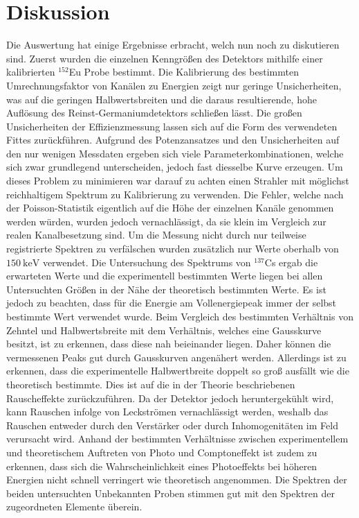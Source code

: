 
\section{Diskussion}
\label{sec:Diskussion}
Die Auswertung hat einige Ergebnisse erbracht, welch nun noch zu diskutieren sind. Zuerst wurden die einzelnen Kenngrößen des Detektors mithilfe einer kalibrierten $^{152}$Eu Probe bestimmt. Die Kalibrierung des bestimmten Umrechnungsfaktor von Kanälen zu Energien zeigt nur geringe Unsicherheiten, was auf die geringen Halbwertsbreiten und die daraus resultierende, hohe Auflösung des Reinst-Germaniumdetektors schließen lässt. Die großen Unsicherheiten der Effizienzmessung lassen sich auf die Form des verwendeten Fittes zurückführen. Aufgrund des Potenzansatzes und den Unsicherheiten auf den nur wenigen Messdaten ergeben sich viele Parameterkombinationen, welche sich zwar grundlegend unterscheiden, jedoch fast diesselbe Kurve erzeugen. Um dieses Problem zu minimieren war darauf zu achten einen Strahler mit möglichst reichhaltigem Spektrum zu Kalibrierung zu verwenden. Die Fehler, welche nach der Poisson-Statistik eigentlich auf die Höhe der einzelnen Kanäle genommen werden würden, wurden jedoch vernachlässigt, da sie klein im Vergleich zur realen Kanalbesetzung sind. Um die Messung nicht durch nur teilweise registrierte Spektren zu verfälschen wurden zusätzlich nur Werte oberhalb von $\SI{150}{\kilo\electronvolt}$ verwendet. Die Untersuchung des Spektrums von $^{137}$Cs ergab die erwarteten Werte und die experimentell bestimmten Werte liegen bei allen Untersuchten Größen in der Nähe der theoretisch bestimmten Werte. Es ist jedoch zu beachten, dass für die Energie am Vollenergiepeak immer der selbst bestimmte Wert verwendet wurde. Beim Vergleich des bestimmten Verhältnis von Zehntel und Halbwertsbreite mit dem Verhältnis, welches eine Gausskurve besitzt, ist zu erkennen, dass diese nah beieinander liegen. Daher können die vermessenen Peaks gut durch Gausskurven angenähert werden. Allerdings ist zu erkennen, dass die experimentelle Halbwertbreite doppelt so groß ausfällt wie die theoretisch bestimmte. Dies ist auf die in der Theorie beschriebenen Rauscheffekte zurückzuführen. Da der Detektor jedoch heruntergekühlt wird, kann Rauschen infolge von Leckströmen vernachlässigt werden, weshalb das Rauschen entweder durch den Verstärker oder durch Inhomogenitäten im Feld verursacht wird. Anhand der bestimmten Verhältnisse zwischen experimentellem und theoretischem Auftreten von Photo und Comptoneffekt ist zudem zu erkennen, dass sich die Wahrscheinlichkeit eines Photoeffekts bei höheren Energien nicht schnell verringert wie theoretisch angenommen. 
Die Spektren der beiden untersuchten Unbekannten Proben stimmen gut mit den Spektren der zugeordneten Elemente überein.
